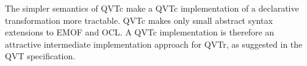 The simpler semantics of QVTc  make a QVTc implementation of a declarative transformation more tractable. QVTc makes only small abstract syntax extensions to EMOF and OCL. A QVTc implementation is therefore an attractive intermediate implementation approach for QVTr, as suggested in the QVT specification.







